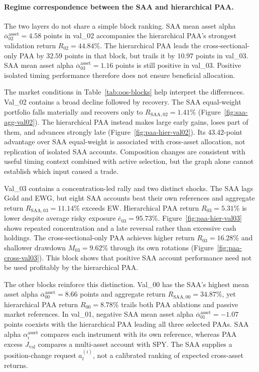 \paragraph{Regime correspondence between the SAA and hierarchical PAA.}
The two layers do not share a simple block ranking. SAA mean asset alpha \(\overline\alpha_{02}^{\mathrm{asset}}=4.58\) points in val\_02 accompanies the hierarchical PAA's strongest validation return \(R_{02}=44.84\%\). The hierarchical PAA leads the cross-sectional-only PAA by \(32.59\) points in that block, but trails it by \(10.97\) points in val\_03. SAA mean asset alpha \(\overline\alpha_{03}^{\mathrm{asset}}=1.16\) points is still positive in val\_03. Positive isolated timing performance therefore does not ensure beneficial allocation.

The market conditions in Table~\ref{tab:oos-blocks} help interpret the differences. Val\_02 contains a broad decline followed by recovery. The SAA equal-weight portfolio falls materially and recovers only to \(R_{\mathrm{SAA},02}=1.41\%\) (Figure~\ref{fig:saa-agg-val02}). The hierarchical PAA instead makes large early gains, loses part of them, and advances strongly late (Figure~\ref{fig:paa-hier-val02}). Its \(43.42\)-point advantage over SAA equal-weight is associated with cross-asset allocation, not replication of isolated SAA accounts. Composition changes are consistent with useful timing context combined with active selection, but the graph alone cannot establish which input caused a trade.

Val\_03 contains a concentration-led rally and two distinct shocks. The SAA lags Gold and EWG, but eight SAA accounts beat their own references and aggregate return \(R_{\mathrm{SAA},03}=11.14\%\) exceeds EW. Hierarchical PAA return \(R_{03}=5.31\%\) is lower despite average risky exposure \(\bar e_{03}=95.73\%\). Figure~\ref{fig:paa-hier-val03} shows repeated concentration and a late reversal rather than excessive cash holdings. The cross-sectional-only PAA achieves higher return \(R_{03}=16.28\%\) and shallower drawdown \(M_{03}=9.62\%\) through its own rotations (Figure~\ref{fig:paa-cross-val03}). This block shows that positive SAA account performance need not be used profitably by the hierarchical PAA.

The other blocks reinforce this distinction. Val\_00 has the SAA's highest mean asset alpha \(\overline\alpha_{00}^{\mathrm{asset}}=8.66\) points and aggregate return \(R_{\mathrm{SAA},00}=34.87\%\), yet hierarchical PAA return \(R_{00}=8.78\%\) trails both PAA ablations and passive market references. In val\_01, negative SAA mean asset alpha \(\overline\alpha_{01}^{\mathrm{asset}}=-1.07\) points coexists with the hierarchical PAA leading all three selected PAAs. SAA alpha \(\alpha_i^{\mathrm{asset}}\) compares each instrument with its own reference, whereas PAA excess \(J_{\mathrm{val}}\) compares a multi-asset account with SPY. The SAA supplies a position-change request \(a_t^{(i)}\), not a calibrated ranking of expected cross-asset returns.

